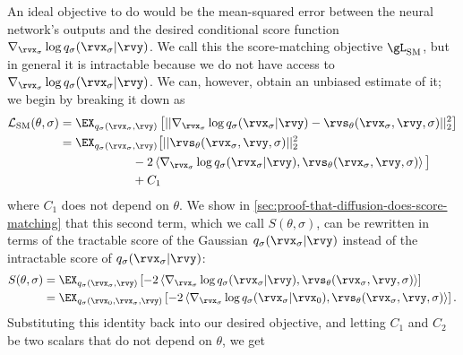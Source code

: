 An ideal objective to do would be the mean-squared error between the neural network's outputs and the desired conditional score function $\nabla_{\rvx_\sigma} \log q_{\sigma}(\rvx_\sigma|\rvy)$. We call this the score-matching objective $\gL_\text{SM}$, but in general it is intractable because we do not have access to $\nabla_{\rvx_\sigma} \log q_{\sigma}(\rvx_\sigma|\rvy)$. We can, however, obtain an unbiased estimate of it; we begin by breaking it down as
\begin{align}
    \mathcal{L}_\text{SM}(\theta, \sigma) &= \EX_{q_{\sigma}(\rvx_\sigma, \rvy)} \left[ || \nabla_{\rvx_\sigma} \log q_{\sigma}(\rvx_\sigma|\rvy) - \rvs_\theta(\rvx_\sigma, \rvy, \sigma) ||_2^2 \right] \\
    &= \EX_{q_{\sigma}(\rvx_\sigma, \rvy)} \big[ 
    || \rvs_\theta(\rvx_\sigma, \rvy, \sigma) ||_2^2
    \nonumber\\ &\qquad\qquad\qquad
    - 2 \left\langle \nabla_{\rvx_\sigma} \log q_{\sigma}(\rvx_\sigma|\rvy),
    \rvs_\theta(\rvx_\sigma, \rvy, \sigma) \right\rangle \big]
    \nonumber\\ &\qquad\qquad\qquad
    + C_1
\end{align}
where $C_1$ does not depend on $\theta$. We show in \cref{sec:proof-that-diffusion-does-score-matching} that this second term, which we call $S(\theta, \sigma)$, can be rewritten in terms of the tractable score of the Gaussian $q_{\sigma}(\rvx_\sigma|\rvy)$ instead of the intractable score of $q_{\sigma}(\rvx_\sigma|\rvy)$:
\begin{align}
\allowdisplaybreaks
S(\theta, \sigma) &= \EX_{q_{\sigma}(\rvx_\sigma, \rvy)} \left[ - 2 \left\langle \nabla_{\rvx_\sigma} \log q_{\sigma}(\rvx_\sigma|\rvy), \rvs_\theta(\rvx_\sigma, \rvy, \sigma) \right\rangle \right] \\
    &= \EX_{q_{\sigma}(\rvx_0, \rvx_\sigma, \rvy)} \left[ -2 \left\langle \nabla_{\rvx_\sigma} \log q_{\sigma}(\rvx_\sigma|\rvx_0), \rvs_\theta(\rvx_\sigma, \rvy, \sigma) \right\rangle  \right].
\end{align}
Substituting this identity back into our desired objective, and letting $C_1$ and $C_2$ be two scalars that do not depend on $\theta$, we get
